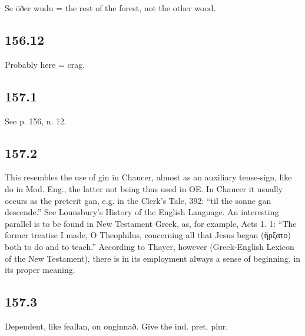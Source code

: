Se ōðer wudu = the rest of the forest, not the other wood.

\subsection*{156.12}

Probably here = crag.

\subsection*{157.1}

See p. 156, n. 12.

\subsection*{157.2}

This resembles the use of gin in Chaucer, almost as an auxiliary tense-sign, like do in Mod. Eng., the latter not being thus used in OE. In Chaucer it usually occurs as the preterit gan, e.g. in the Clerk’s Tale, 392: “til the sonne gan descende.” See Lounsbury’s History of the English Language. An interesting parallel is to be found in New Testament Greek, as, for example, Acts 1. 1: “The former treatise I made, O Theophilus, concerning all that Jesus began (ἤρξατο) both to do and to teach.” According to Thayer, however (Greek-English Lexicon of the New Testament), there is in its employment always a sense of beginning, in its proper meaning.

\subsection*{157.3}

Dependent, like feallan, on onginnað. Give the ind. pret. plur.

